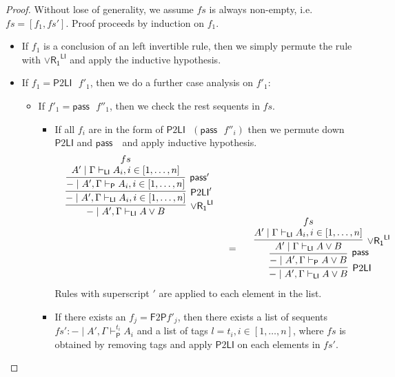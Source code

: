\documentclass[submission,copyright,creativecommons]{eptcs}
\theoremstyle{definition}
\newcommand{\pass}{\mathsf{pass}}
\newcommand{\orrone}{\lor \mathsf{R_{1}}}
\newcommand{\LI}{\mathsf{LI}}
\newcommand{\Pass}{\mathsf{P}}
\newcommand{\F}{\mathsf{F}}
\newcommand{\proofbox}[1]{\begin{tabular}{l} #1 \end{tabular}}
\begin{document}
\begin{proof}
  Without lose of generality, we assume $fs$ is always non-empty, i.e. $fs = [f_1 , fs']$.
  Proof proceeds by induction on $f_1$.
  \begin{itemize}
    \item If $f_1$ is a conclusion of an left invertible rule, then we simply permute the rule with $\orrone^{\LI}$ and apply the inductive hypothesis.
    \item If $f_1 = \Pass 2 \LI \text{ } f'_1$, then we do a further case analysis on $f'_1$:
    \begin{itemize}
      \item If $f'_1 = \pass \text{ } f''_1$, then we check the rest sequents in $fs$. 
      \begin{itemize}
        \item If all $f_i$ are in the form of $\Pass 2 \LI \text{ } (\pass \text{ } f''_i)$ then we permute down $\Pass 2 \LI $ and $\pass \text{ }$ and apply inductive hypothesis.
        \begin{displaymath}
          \begin{array}{cc}
            \proofbox{
              \infer[\orrone^{\LI}]{- \mid A' , \Gamma \vdash_{\LI} A \lor B}{
                \infer[\Pass 2 \LI']{- \mid A' , \Gamma \vdash_{\LI} A_i , i \in [1 , \dots , n]}{
                  \infer[\pass']{- \mid A', \Gamma \vdash_{\Pass} A_i , i \in [1 , \dots , n]}{
                    \deduce{A' \mid \Gamma \vdash_{\LI} A_i , i \in [1 , \dots , n]}{fs}
                  }
                }
              }
            }
            \\[10pt]
            &
            =
            \quad
            \proofbox{
              \infer[\Pass 2 \LI]{- \mid A' , \Gamma \vdash_{\LI} A \lor B}{
                \infer[\pass]{- \mid A' , \Gamma \vdash_{\Pass} A \lor B}{
                  \infer[\orrone^{\LI}]{A' \mid \Gamma \vdash_{\LI} A \lor B}{
                    \deduce{A' \mid \Gamma \vdash_{\LI} A_i , i \in [1 , \dots , n]}{fs}
                  }
                }
              }
            }
          \end{array}
        \end{displaymath}
        Rules with superscript $'$ are applied to each element in the list.
        \item If there exists an $f_j = \F 2 \Pass f'_j$, then there exists a list of sequents $fs' : - \mid A' , \Gamma \vdash^{t_i}_{\Pass} A_i$ and a list of tags $l = t_i , i \in [1 , \dots , n]$, where $fs$ is obtained by removing tags and apply $\Pass 2 \LI$ on each elements in $fs'$.

\end{itemize}
\end{itemize}
\end{itemize}
\end{proof}
\end{document}
